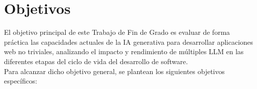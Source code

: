 

\chapter{Objetivos} \label{chap:Goals}

El objetivo principal de este Trabajo de Fin de Grado es evaluar de forma práctica las capacidades actuales de la \ac{IA} generativa para desarrollar aplicaciones web no triviales, analizando el impacto y rendimiento de múltiples \ac{LLM} en las diferentes etapas del ciclo de vida del desarrollo de software.\\

\noindent Para alcanzar dicho objetivo general, se plantean los siguientes objetivos específicos:

